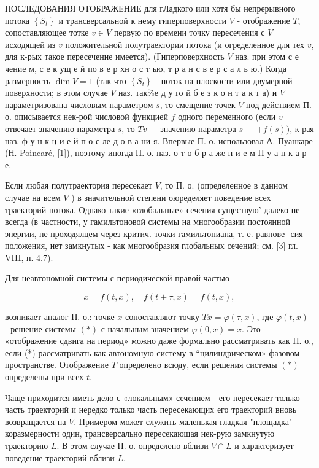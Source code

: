 \documentclass[10pt]{article}
\begin{document}
ПОСЛЕДОВАНИЯ ОТОБРАЖЕНИЕ для гЛадкого или хотя бы непрерывного потока $\left\{S_{t}\right\}$ и трансверсальной к нему гиперповерхности $V$ - отображение $T$, сопоставляющее тотке $v \in V$ первую по времени точку пересечения с $V$ исходящей из $v$ положительной полутраектории потока (и огределенное для тех $v$, для к-рых такое пересечение имеется). (Гиперповерхность $V$ наз. при этом с е чение м, с е к ущ е й по в е р хн о с т ью, т р а н с в е р с а л ь ю.) Когда размерность $\operatorname{dim} V=1$ (так что $\left\{S_{t}\right\}$ - поток на плоскости или двумерной поверхности; в этом случае $V$ наз. так\%е д у го й б е з к о н т а к т а) и $V$ параметризована числовым параметром $s$, то смещение точек $V$ под действием П. о. описывается нек-рой числовой функцией $f$ одного переменного (если $v$ отвечает значению параметра $s$, то $T v-$ значению параметра $s+$ $+f(s))$, к-рая наз. ф у н к ц и е й п о с ле д о в а ни я. Впервые П. о. использовал А. Пуанкаре (Н. Poincaré, [1]), поэтому иногда П. о. наз. о т о б р а же н и е м П у а н к а р е.



Если любая полутраектория пересекает $V$, то П. о. (определенное в данном случае на всем $V$ ) в значительной степени оюределяет поведение всех траекторий потока. Однако такие «глобальные» сечения существую' далеко не всегда (в частности, у гамильтоновой системы на многообразии постоянной энергии, не проходялцем через критич. точки гамильтониана, т. е. равнове- сия положения, нет замкнутых - как многообразия глобальных сечений; см. [3] гл. VIII, п. 4.7).



Для неавтономной системы с периодической правой частью



\[

\dot{x}=f(t, x), \quad f(t+\tau, x)=f(t, x),

\]



возникает аналог П. о.: точке $x$ сопоставляют точку $T x=\varphi(\tau, x)$, где $\varphi(t, x)$ - решение системы $(*)$ с начальным значением $\varphi(0, x)=x$. Это «отображение сдвига на период» можно даже формально рассматривать как П. о., если (*) рассматривать как автономную систему в “цилиндрическом» фазовом пространстве. Отображение $T$ определено всюду, если решения системы $(*)$ определены при всех $t$.



Чаще приходится иметь дело с «локальным» сечением - его пересекает только часть траекторий и нередко только часть пересекающих его траекторий вновь возвращается на $V$. Примером может служить маленькая гладкая "площадка" коразмерности один, трансверсально пересекающая нек-рую замкнутую траекторию $L$. В этом случае П. о. определено вблизи $V \cap L$ и характеризует поведение траекторий вблизи $L$.
\end{document}
